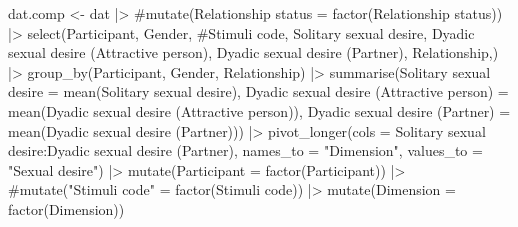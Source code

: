 \documentclass[
  bookmarksnumbered]{article}
\newenvironment{Shaded}{\begin{snugshade}}{\end{snugshade}}
\newcommand{\AttributeTok}[1]{\textcolor[rgb]{0.80,0.80,0.80}{#1}}
\newcommand{\CommentTok}[1]{\textcolor[rgb]{0.50,0.62,0.50}{#1}}
\newcommand{\FunctionTok}[1]{\textcolor[rgb]{0.94,0.94,0.56}{#1}}
\newcommand{\NormalTok}[1]{\textcolor[rgb]{0.80,0.80,0.80}{#1}}
\newcommand{\OtherTok}[1]{\textcolor[rgb]{0.94,0.94,0.56}{#1}}
\newcommand{\SpecialCharTok}[1]{\textcolor[rgb]{0.86,0.64,0.64}{#1}}
\newcommand{\StringTok}[1]{\textcolor[rgb]{0.80,0.58,0.58}{#1}}
\begin{document}
\begin{Shaded}
\begin{Highlighting}[]
\NormalTok{dat.comp }\OtherTok{\textless{}{-}}\NormalTok{ dat }\SpecialCharTok{|\textgreater{}}
  \CommentTok{\#mutate(\textasciigrave{}Relationship status\textasciigrave{} = factor(\textasciigrave{}Relationship status\textasciigrave{})) |\textgreater{} }
  \FunctionTok{select}\NormalTok{(Participant, Gender, }
         \CommentTok{\#\textasciigrave{}Stimuli code\textasciigrave{},}
         \StringTok{\textasciigrave{}}\AttributeTok{Solitary sexual desire}\StringTok{\textasciigrave{}}\NormalTok{, }
         \StringTok{\textasciigrave{}}\AttributeTok{Dyadic sexual desire (Attractive person)}\StringTok{\textasciigrave{}}\NormalTok{, }
         \StringTok{\textasciigrave{}}\AttributeTok{Dyadic sexual desire (Partner)}\StringTok{\textasciigrave{}}\NormalTok{, }
\NormalTok{         Relationship,) }\SpecialCharTok{|\textgreater{}}
  \FunctionTok{group\_by}\NormalTok{(Participant, Gender, Relationship) }\SpecialCharTok{|\textgreater{}} 
  \FunctionTok{summarise}\NormalTok{(}\StringTok{\textasciigrave{}}\AttributeTok{Solitary sexual desire}\StringTok{\textasciigrave{}} \OtherTok{=} 
              \FunctionTok{mean}\NormalTok{(}\StringTok{\textasciigrave{}}\AttributeTok{Solitary sexual desire}\StringTok{\textasciigrave{}}\NormalTok{),}
            \StringTok{\textasciigrave{}}\AttributeTok{Dyadic sexual desire (Attractive person)}\StringTok{\textasciigrave{}} \OtherTok{=} 
              \FunctionTok{mean}\NormalTok{(}\StringTok{\textasciigrave{}}\AttributeTok{Dyadic sexual desire (Attractive person)}\StringTok{\textasciigrave{}}\NormalTok{),}
            \StringTok{\textasciigrave{}}\AttributeTok{Dyadic sexual desire (Partner)}\StringTok{\textasciigrave{}} \OtherTok{=} 
              \FunctionTok{mean}\NormalTok{(}\StringTok{\textasciigrave{}}\AttributeTok{Dyadic sexual desire (Partner)}\StringTok{\textasciigrave{}}\NormalTok{)) }\SpecialCharTok{|\textgreater{}} 
  \FunctionTok{pivot\_longer}\NormalTok{(}\AttributeTok{cols =} \StringTok{\textasciigrave{}}\AttributeTok{Solitary sexual desire}\StringTok{\textasciigrave{}}\SpecialCharTok{:}\StringTok{\textasciigrave{}}\AttributeTok{Dyadic sexual desire (Partner)}\StringTok{\textasciigrave{}}\NormalTok{,}
               \AttributeTok{names\_to =} \StringTok{"Dimension"}\NormalTok{, }
               \AttributeTok{values\_to =} \StringTok{"Sexual desire"}\NormalTok{) }\SpecialCharTok{|\textgreater{}} 
  \FunctionTok{mutate}\NormalTok{(}\AttributeTok{Participant =} \FunctionTok{factor}\NormalTok{(Participant)) }\SpecialCharTok{|\textgreater{}}
  \CommentTok{\#mutate("Stimuli code" = factor(\textasciigrave{}Stimuli code\textasciigrave{})) |\textgreater{}}
  \FunctionTok{mutate}\NormalTok{(}\AttributeTok{Dimension =} \FunctionTok{factor}\NormalTok{(Dimension))}
\end{Highlighting}
\end{Shaded}
\end{document}
